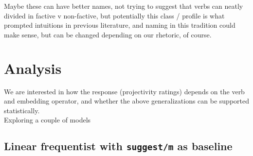 \documentclass[10pt]{article}\usepackage[]{graphicx}\usepackage[dvipsnames]{xcolor}
\begin{document}
Maybe these can have better names, not trying to suggest that verbs can neatly divided in factive v non-factive, but potentially this class / profile is what prompted intuitions in previous literature, and naming in this tradition could make sense, but can be changed depending on our rhetoric, of course.

\section{Analysis}

We are interested in how the response (projectivity ratings) depends on the verb and embedding operator, and whether the above generalizations can be supported statistically.\\

Exploring a couple of models

\subsection{Linear frequentist with \texttt{suggest/m} as baseline}
\end{document}
